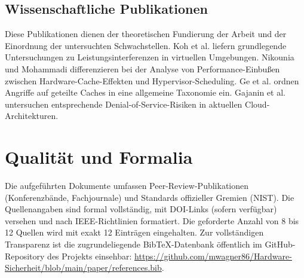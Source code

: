 \documentclass[conference]{IEEEtran}
\begin{document}
\subsection{Wissenschaftliche Publikationen}
Diese Publikationen dienen der theoretischen Fundierung der Arbeit und der Einordnung der untersuchten Schwachstellen. Koh et al. \cite{koh2007analysis} liefern grundlegende Untersuchungen zu Leistungsinterferenzen in virtuellen Umgebungen. Nikounia und Mohammadi \cite{nikounia2018hypervisor} differenzieren bei der Analyse von Performance-Einbußen zwischen Hardware-Cache-Effekten und Hypervisor-Scheduling. Ge et al. \cite{ge2018survey} ordnen Angriffe auf geteilte Caches in eine allgemeine Taxonomie ein. Gajanin et al. \cite{gajanin2025performance} untersuchen entsprechende Denial-of-Service-Risiken in aktuellen Cloud-Architekturen.

\section{Qualität und Formalia}
Die aufgeführten Dokumente umfassen Peer-Review-Publikationen (Konferenzbände, Fachjournale) und Standards offizieller Gremien (NIST). Die Quellenangaben sind formal vollständig, mit DOI-Links (sofern verfügbar) versehen und nach IEEE-Richtlinien formatiert. Die geforderte Anzahl von 8 bis 12 Quellen wird mit exakt 12 Einträgen eingehalten. Zur vollständigen Transparenz ist die zugrundeliegende BibTeX-Datenbank öffentlich im GitHub-Repository des Projekts einsehbar: \url{https://github.com/mwagner86/Hardware-Sicherheit/blob/main/paper/references.bib}.



\end{document}
